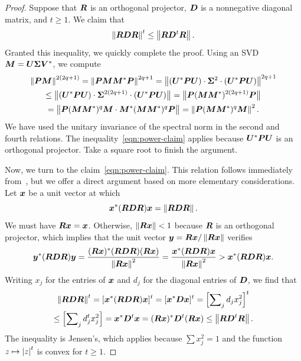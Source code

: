 \documentclass[final]{siamltex}
\begin{document}
\begin{proof}
Suppose that $\bm{R}$ is an orthogonal projector, $\bm{D}$ is a nonnegative diagonal
matrix, and $t \geq 1$.  We claim that
\begin{equation} \label{eqn:power-claim}
\norm{ \mtx{RDR} }^t \leq \norm{\mtx{R} \mtx{D}^t \mtx{R}}.
\end{equation}
Granted this inequality, we quickly complete the proof.  Using an SVD $\bm{M} = \bm{U\Sigma V}^*$,
we compute
\begin{multline*}
\left\Vert { \bm{PM} } \right\Vert^{2(2q+1)}
    = \left\Vert { \bm{PMM}^*\bm{P} } \right\Vert^{2q+1}
    = \left\Vert { (\bm{U}^*\bm{PU}) \cdot \bm{\Sigma}^2 \cdot (\bm{U}^*\bm{P} \bm{U}) } \right\Vert^{2q+1} \\
    \leq {\bigl\Vert { (\bm{U}^*\bm{PU}) \cdot \bm{\Sigma}^{2(2q+1)} \cdot (\bm{U}^*\bm{P} \bm{U}) } \bigr\Vert}_{}
    = {\bigl\Vert { \bm{P} (\bm{MM}^*)^{2(2q+1)} \bm{P} } \bigr\Vert}_{} \\
    = {\bigl\Vert { \bm{P} (\bm{MM}^*)^q \bm{M} \cdot \bm{M}^*(\bm{MM}^*)^q \bm{P} } \bigr\Vert}_{}
    = \left\Vert { \bm{P} (\bm{MM}^*)^{q} \bm{M} } \right\Vert^2.
\end{multline*}
We have used the unitary invariance of the spectral norm in the second and fourth relations.
The inequality~\eqref{eqn:power-claim} applies because $\bm{U}^* \bm{PU}$
is an orthogonal projector.  Take a square root to finish the argument.

Now, we turn to the claim~\eqref{eqn:power-claim}.  This relation follows immediately
from~\cite[Thm.~IX.2.10]{Bha97:Matrix-Analysis}, but we offer a direct argument
based on more elementary considerations.  Let $\bm{x}$ be a unit vector at which
$$
\bm{x}^* (\bm{RDR}) \bm{x} = \left\Vert {\bm{RDR}} \right\Vert.
$$
We must have $\bm{R}\bm{x} = \bm{x}$.  Otherwise, $\left\Vert { \bm{R}\bm{x} } \right\Vert < 1$ because $\bm{R}$
is an orthogonal projector, which implies that the unit vector
$\bm{y} = \bm{R}\bm{x} / \left\Vert { \bm{R}\bm{x} } \right\Vert$ verifies
$$
\bm{y}^* (\bm{RDR}) \bm{y}
    = \frac{(\bm{R}\bm{x})^* (\bm{RDR}) (\bm{R}\bm{x})}{ \left\Vert {\bm{R}\bm{x}} \right\Vert^2 }
    = \frac{\bm{x}^* (\bm{RDR}) \bm{x}}{ \left\Vert {\bm{R}\bm{x}} \right\Vert^2 }
    > \bm{x}^* (\bm{RDR}) \bm{x}.
$$
Writing $x_j$ for the entries of $\bm{x}$ and $d_j$ for the diagonal entries of $\bm{D}$, we find that
\begin{multline*}
\left\Vert {\bm{RDR}} \right\Vert^t = [\bm{x}^* (\bm{RDR}) \bm{x}]^t = [\bm{x}^* \bm{D} \bm{x}]^t
    = \left[ \sum\nolimits_j d_j x_j^2 \right]^t \\
    \leq \left[ \sum\nolimits_j d_j^t x_j^2 \right]
    = \bm{x}^* \bm{D}^t \bm{x}
    = (\bm{R} \bm{x})^* \bm{D}^t (\bm{R} \bm{x})
    \leq \left\Vert { \bm{RD}^t\bm{R} } \right\Vert.
\end{multline*}
The inequality is Jensen's, which applies because $\sum x_j^2 = 1$
and the function $z \mapsto \left\vert {z} \right\vert^t$ is convex for $t \geq 1$.
\end{proof}
\end{document}
